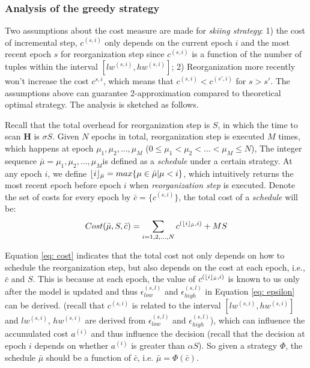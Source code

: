 \subsubsection{Analysis of the greedy strategy}
Two assumptions about the cost measure are made for {\em skiing strategy}: 1) the cost of incremental step, $c^{(s, i)}$ only depends on the current epoch $i$ and the most recent epoch $s$ for reorganization step since $c^{(s, i)}$ is a function of the number of tuples within the interval $[lw^{(s,i)}, hw^{(s,i)}]$; 2) Reorganization more recently won't increase the cost $c^{s,i}$, which means that $c^{(s, i)} < c^{(s',i)}$ for $s > s'$. The assumptions above can guarantee 2-approximation compared to theoretical optimal strategy. The analysis is sketched as follows.


Recall that the total overhead for reorganization step is $S$, in which the time to scan $\textbf{H}$ is $\sigma S$. Given $N$ epochs in total, reorganization step is executed $M$ times, which happens at epoch $\mu_1, \mu_2,\dots, \mu_M$ ($0 \leq \mu_1 < \mu_2 < \dots < \mu_M \leq N$), The integer sequence $\bar{\mu} = \mu_1, \mu_2,\dots, \mu_M$is defined as a {\em schedule} under a certain strategy. At any epoch $i$, we define $\lfloor i\rfloor_{\bar{\mu}} = max\{\mu \in \bar{\mu} | \mu < i\}$, which intuitively returns the most recent epoch before epoch $i$ when {\em reorganization step} is executed. Denote the set of costs for every epoch by $\bar{c} = \{c^{(s,i)}\}$, the total cost of a {\em schedule} will be:
\begin{equation}\label{eq: cost}
    Cost(\bar{\mu}, S, \bar{c}) = \sum_{i=1,2,\dots,N}c^{(\lfloor i\rfloor_{\bar{\mu}}, i)} + MS
\end{equation}

Equation \ref{eq: cost} indicates that the total cost not only depends on how to schedule the reorganization step, but also depends on the cost at each epoch, i.e., $\bar{c}$ and $S$. This is because at each epoch, the value of $c^{(\lfloor i\rfloor_{\bar{\mu}}, i)}$ is known to us only after the model is updated and thus $\epsilon^{(s,l)}_{low}$ and $\epsilon^{(s,l)}_{high}$ in Equation \ref{eq: epsilon} can be derived. (recall that $c^{(s,i)}$ is related to the interval $[lw^{(s,i)}, hw^{(s,i)}]$ and $lw^{(s,i)}$, $hw^{(s,i)}$ are derived from $\epsilon^{(s,l)}_{low}$ and $\epsilon^{(s,l)}_{high}$), which can influence the accumulated cost $a^{(i)}$ and thus influence the decision (recall that the decision at epoch $i$ depends on whether $a^{(i)}$ is greater than $\alpha S$). So given a strategy $\Phi$, the schedule $\bar{\mu}$ should be a function of $\bar{c}$, i.e. $\bar{\mu} = \Phi(\bar{c})$.


